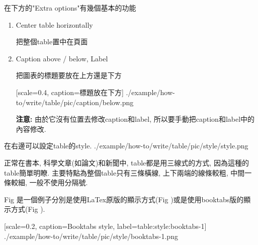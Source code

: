 \newpage
{}

  在下方的"Extra options"有幾個基本的功能

\begin{enumerate}

  \item
  {
  Center table horizontally

  把整個table置中在頁面

  } %

  \label{chapter:how-to:write:table:label-example}
  \item
  {
  Caption above / below, Label

  把圖表的標題要放在上方還是下方

    {
      [scale=0.4,
      caption={標題放在下方}]
      {./example/how-to/write/table/pic/caption/below.png}
    }

  {\bf 注意:} 由於它沒有位置去修改caption和label, 所以要手動把caption和label中的內容修改.
  } %
\end{enumerate}

\newpage
{}

  在右邊可以設定table的style.
  \InsertFigure
    {./example/how-to/write/table/pic/style/style.png}

   正常在書本, 科學文章(如論文)和新聞中, table都是用三線式的方式, 因為這種的table簡單明瞭. 主要特點為整個table只有三條橫線, 上下兩端的線條較粗, 中間一條較細, 一般不使用分隔號.

  Fig 是一個例子分別是使用LaTex原版的顯示方式(Fig )或是使用booktabs版的顯示方式(Fig ).

    {
      [scale=0.2,
      caption={Booktabs style},
      label={table:style:booktabs-1}]
      {./example/how-to/write/table/pic/style/booktabs-1.png}
    }

